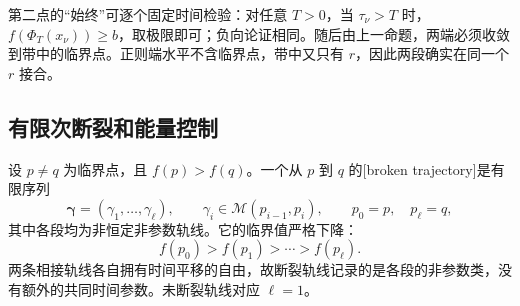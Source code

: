 第二点的“始终”可逐个固定时间检验：对任意 \(T>0\)，当 \(\tau_\nu>T\) 时，\(f(\Phi_T(x_\nu))\ge b\)，取极限即可；负向论证相同。随后由上一命题，两端必须收敛到带中的临界点。正则端水平不含临界点，带中又只有 \(r\)，因此两段确实在同一个 \(r\) 接合。

\subsection{有限次断裂和能量控制}
\label{g2:subsec:1802:03}

设 \(p\ne q\) 为临界点，且 \(f(p)>f(q)\)。一个从 \(p\) 到 \(q\) 的[broken trajectory]是有限序列
\[
	\boldsymbol\gamma=(\gamma_1,\ldots,\gamma_\ell),\qquad
	\gamma_i\in\mathcal M(p_{i-1},p_i),\qquad
	p_0=p,\quad p_\ell=q,
\]
其中各段均为非恒定非参数轨线。它的临界值严格下降：
\[
	f(p_0)>f(p_1)>\cdots>f(p_\ell).
\]
两条相接轨线各自拥有时间平移的自由，故断裂轨线记录的是各段的非参数类，没有额外的共同时间参数。未断裂轨线对应 \(\ell=1\)。

